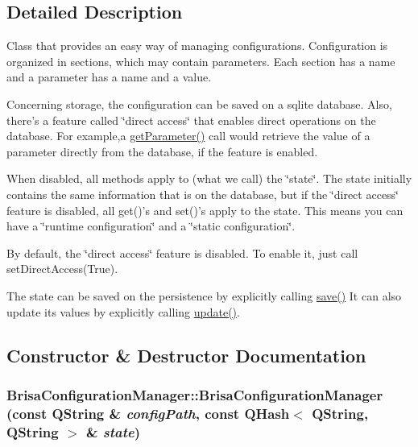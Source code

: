 \subsection{Detailed Description}
Class that provides an easy way of managing configurations. Configuration is organized in sections, which may contain parameters. Each section has a name and a parameter has a name and a value.

Concerning storage, the configuration can be saved on a sqlite database. Also, there's a feature called \char`\"{}direct access\char`\"{} that enables direct operations on the database. For example,a \hyperlink{classBrisaCore_1_1BrisaConfigurationManager_abdfdf034b2bd536aa85cf3ecfc2c5f07}{getParameter()} call would retrieve the value of a parameter directly from the database, if the feature is enabled.

When disabled, all methods apply to (what we call) the \char`\"{}state\char`\"{}. The state initially contains the same information that is on the database, but if the \char`\"{}direct access\char`\"{} feature is disabled, all get()'s and set()'s apply to the state. This means you can have a \char`\"{}runtime configuration\char`\"{} and a \char`\"{}static configuration\char`\"{}.

By default, the \char`\"{}direct access\char`\"{} feature is disabled. To enable it, just call setDirectAccess(True).

The state can be saved on the persistence by explicitly calling \hyperlink{classBrisaCore_1_1BrisaConfigurationManager_a3da3cd7739a19d536d763cef39d8adfa}{save()} It can also update its values by explicitly calling \hyperlink{classBrisaCore_1_1BrisaConfigurationManager_a0e3ce5560d14df248cd95338f83dbb2e}{update()}. 

\subsection{Constructor \& Destructor Documentation}
\hypertarget{classBrisaCore_1_1BrisaConfigurationManager_a4bc1f6a85872924f96d86ac4193a1363}{
\subsubsection[{BrisaConfigurationManager}]{\setlength{\rightskip}{0pt plus 5cm}BrisaConfigurationManager::BrisaConfigurationManager (const QString \& {\em configPath}, \/  const QHash$<$ QString, QString $>$ \& {\em state})}}
\label{classBrisaCore_1_1BrisaConfigurationManager_a4bc1f6a85872924f96d86ac4193a1363}


